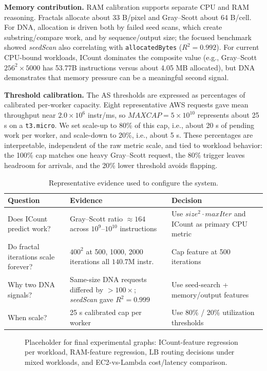 \documentclass[10pt]{article}
\newcommand{\whiteplaceholder}[2]{%
  \begin{center}
  \fcolorbox{black}{white}{\rule{0pt}{#2}\rule{#1}{0pt}}
  \end{center}%
}
\begin{document}
\textbf{Memory contribution.} RAM calibration supports separate CPU and RAM reasoning. Fractals allocate about 33 B/pixel and Gray--Scott about 64 B/cell. For DNA, allocation is driven both by failed seed scans, which create substring/compare work, and by sequence/output size; the focused benchmark showed \emph{seedScan} also correlating with \texttt{allocatedBytes} ($R^2=0.992$). For current CPU-bound workloads, ICount dominates the composite value (e.g., Gray--Scott $256^2\times5000$ has 53.77B instructions versus about 4.05 MB allocated), but DNA demonstrates that memory pressure can be a meaningful second signal.

\textbf{Threshold calibration.} The AS thresholds are expressed as percentages of calibrated per-worker capacity. Eight representative AWS requests gave mean throughput near $2.0\times10^6$ instr/ms, so $MAXCAP=5\times10^{10}$ represents about 25 s on a \texttt{t3.micro}. We set scale-up to 80\% of this cap, i.e., about 20 s of pending work per worker, and scale-down to 20\%, i.e., about 5 s. These percentages are interpretable, independent of the raw metric scale, and tied to workload behavior: the 100\% cap matches one heavy Gray--Scott request, the 80\% trigger leaves headroom for arrivals, and the 20\% lower threshold avoids flapping.

\begin{table}[H]
\centering
\scriptsize
\caption{Representative evidence used to configure the system.}
\begin{tabularx}{\columnwidth}{@{}lYY@{}}
\toprule
Question & Evidence & Decision \\
\midrule
Does ICount predict work? & Gray--Scott ratio $\approx164$ across $10^9$--$10^{10}$ instructions & Use $size^2\cdot maxIter$ and ICount as primary CPU metric \\
Do fractal iterations scale forever? & $400^2$ at 500, 1000, 2000 iterations all $140.7$M instr. & Cap feature at 500 iterations \\
Why two DNA signals? & Same-size DNA requests differed by $>100\times$; \emph{seedScan} gave $R^2=0.999$ & Use seed-search + memory/output features \\
When scale? & 25 s calibrated cap per worker & Use 80\% / 20\% utilization thresholds \\
\bottomrule
\end{tabularx}
\end{table}

\begin{figure}[H]
\whiteplaceholder{0.88\columnwidth}{0.60\columnwidth}
\caption{Placeholder for final experimental graphs: ICount-feature regression per workload, RAM-feature regression, LB routing decisions under mixed workloads, and EC2-vs-Lambda cost/latency comparison.}
\label{fig:eval}
\end{figure}
\end{document}
